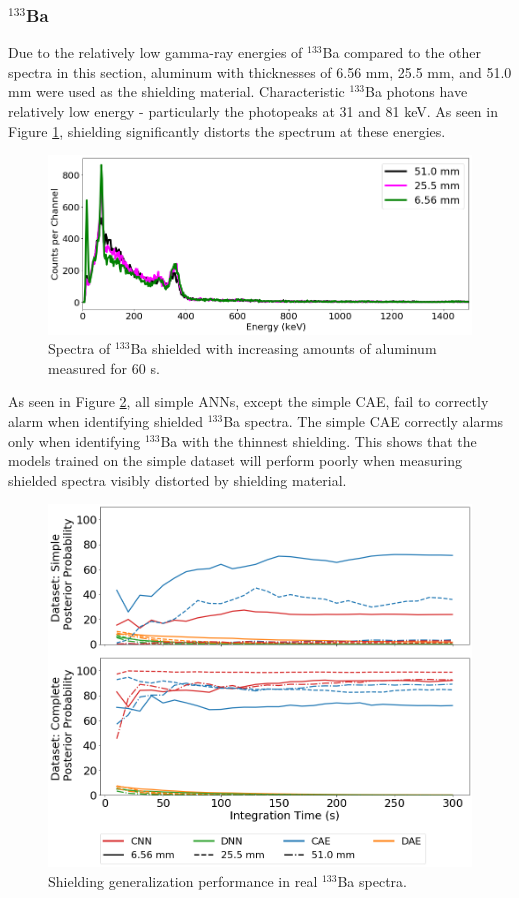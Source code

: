 \subsubsection{$^{133}$Ba}

Due to the relatively low gamma-ray energies of $^{133}$Ba compared to the other spectra in this section, aluminum with thicknesses of 6.56 mm, 25.5 mm, and 51.0 mm were used as the shielding material. Characteristic $^{133}$Ba photons have relatively low energy - particularly the photopeaks at 31 and 81 keV. As seen in Figure \ref{fig:shielded_ba133}, shielding significantly distorts the spectrum at these energies.

\begin{figure}[H]
	\centering
	\includegraphics[width=0.8\linewidth]{images/shielded_ba133}
	\caption{Spectra of $^{133}$Ba shielded with increasing amounts of aluminum measured for 60 s.}
	\label{fig:shielded_ba133}
\end{figure}

As seen in Figure \ref{fig:alum_ba133}, all simple ANNs, except the simple CAE, fail to correctly alarm when identifying shielded $^{133}$Ba spectra. The simple CAE correctly alarms only when identifying $^{133}$Ba with the thinnest shielding. This shows that the models trained on the simple dataset will perform poorly when measuring shielded spectra visibly distorted by shielding material.

\begin{figure}[H]
	\centering
	\includegraphics[width=0.8\linewidth]{images/alum_ba133}	\caption{Shielding generalization performance in real $^{133}$Ba spectra.}
	\label{fig:alum_ba133}
\end{figure}

